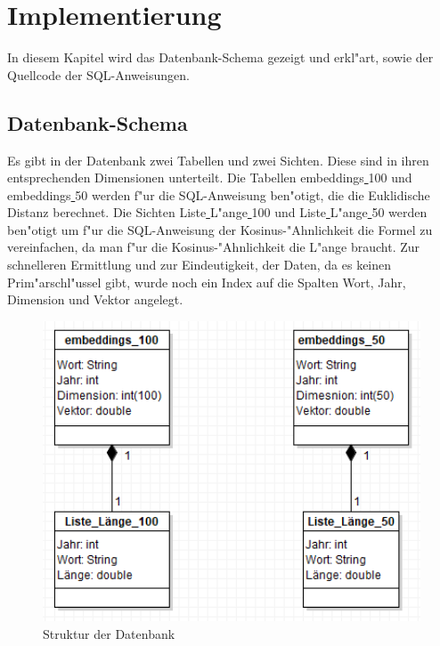 
\chapter{Implementierung}

In diesem Kapitel wird das Datenbank-Schema gezeigt und erkl"art, sowie der Quellcode der SQL-Anweisungen.

\section{Datenbank-Schema}
Es gibt in der Datenbank zwei Tabellen und zwei Sichten. Diese sind in ihren entsprechenden Dimensionen unterteilt. Die Tabellen embeddings\underline{  }100 und embeddings\underline{ }50 werden f"ur die SQL-Anweisung ben"otigt, die die Euklidische Distanz berechnet. Die Sichten Liste\underline{ }L"ange\underline{ }100 und Liste\underline{ }L"ange\underline{ }50 werden ben"otigt um f"ur die SQL-Anweisung der Kosinus-"Ahnlichkeit die Formel zu vereinfachen, da man f"ur die Kosinus-"Ahnlichkeit die L"ange braucht.
Zur schnelleren Ermittlung und zur Eindeutigkeit, der Daten, da es keinen Prim"arschl"ussel gibt, wurde noch ein Index auf die Spalten Wort, Jahr, Dimension und Vektor angelegt.\\

\begin{figure}[bth] 
\includegraphics[width=13cm]{Graphics/Datenbank.png}
\caption[Datenbank-Schema]{Struktur der Datenbank}
\end{figure}
\pagebreak

